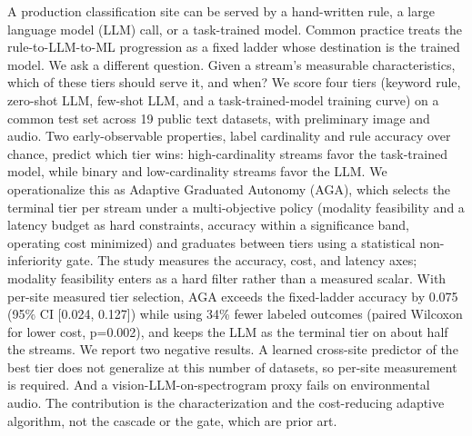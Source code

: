 A production classification site can be served by a hand-written rule, a
large language model (LLM) call, or a task-trained model. Common
practice treats the rule-to-LLM-to-ML progression as a fixed ladder
whose destination is the trained model. We ask a different question.
Given a stream's measurable characteristics, which of these tiers should
serve it, and when? We score four tiers (keyword rule, zero-shot LLM,
few-shot LLM, and a task-trained-model training curve) on a common test
set across 19 public text datasets, with preliminary image and audio.
Two early-observable properties, label cardinality and rule accuracy
over chance, predict which tier wins: high-cardinality streams favor the
task-trained model, while binary and low-cardinality streams favor the
LLM. We operationalize this as Adaptive Graduated Autonomy (AGA), which
selects the terminal tier per stream under a multi-objective policy
(modality feasibility and a latency budget as hard constraints, accuracy
within a significance band, operating cost minimized) and graduates
between tiers using a statistical non-inferiority gate. The study
measures the accuracy, cost, and latency axes; modality feasibility
enters as a hard filter rather than a measured scalar. With per-site
measured tier selection, AGA exceeds the fixed-ladder accuracy by 0.075
(95\% CI {[}0.024, 0.127{]}) while using 34\% fewer labeled outcomes
(paired Wilcoxon for lower cost, p=0.002), and keeps the LLM as the
terminal tier on about half the streams. We report two negative results.
A learned cross-site predictor of the best tier does not generalize at
this number of datasets, so per-site measurement is required. And a
vision-LLM-on-spectrogram proxy fails on environmental audio. The
contribution is the characterization and the cost-reducing adaptive
algorithm, not the cascade or the gate, which are prior art.
